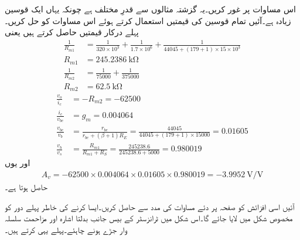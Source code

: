 اس مساوات پر غور کریں۔یہ گزشتہ مثالوں سے قدرِ مختلف ہے چونکہ یہاں ایک قوسین زیادہ ہے۔آئیں تمام قوسین کی قیمتیں استعمال کرتے ہوئے اس مساوات کو حل کریں۔پہلے درکار قیمتیں حاصل کرتے ہیں یعنی
\begin{align*}
\frac{1}{R_{m1}}&=\frac{1}{320 \times 10^{3}}+\frac{1}{1.7 \times 10^6 } +\frac{1}{44045+(179+1) \times 15 \times 10^3}\\
R_{m1}&=\SI{245.2386}{\kilo \ohm}\\
\frac{1}{R_{m2}}&=\frac{1}{75000}+\frac{1}{375000}\\
R_{m2}&=\SI{62.5}{\kilo \ohm}
\end{align*}
\begin{align*}
\frac{v_o}{i_c}&=-R_{m2}=\num{-62500}\\
\frac{i_c}{v_{be}}&=g_m=\num{0.004064}\\
\frac{v_{be}}{v_b}&=\frac{r_{be}}{r_{be}+(\beta+1)R_E}=\frac{44045}{44045+(179+1) \times 15000}=\num{0.01605}\\
\frac{v_b}{v_s}&=\frac{R_{m1}}{R_{m1}+R_S}=\frac{245238.6}{245238.6+5000}=\num{0.980019}
\end{align*}
اور یوں
\begin{align*}
A_v=-62500 \times 0.004064 \times 0.01605 \times 0.980019 =\SI[per=frac,fraction=nice]{-3.9952}{\volt \per \volt}
\end{align*}
حاصل ہوتا ہے۔

آئیں اسی افزائش کو صفحہ  پر دئے مساوات  کی مدد سے حاصل کریں۔ایسا کرنے کی خاطر پہلے دور کو مخصوص شکل میں لایا جائے گا۔اس شکل میں ٹرانزسٹر کے بیس جانب بدلتا اشارہ اور مزاحمت سلسلہ وار جڑے ہونے چاہئے۔پہلے یہی کرتے ہیں۔


